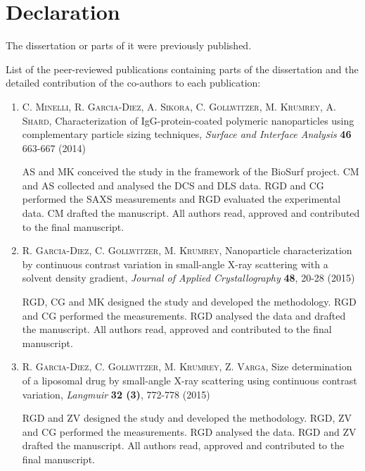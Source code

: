 \noindent
\pagestyle{empty}

\section*{Declaration}

The dissertation or parts of it were previously published.
\vspace{2ex}

List of the peer-reviewed publications containing parts of the dissertation and the detailed contribution of the co-authors to each publication:

\begin{enumerate}

    \item \textsc{C. Minelli, R. Garcia-Diez, A. Sikora, C. Gollwitzer, M. Krumrey, A. Shard}, Characterization of IgG-protein-coated polymeric nanoparticles using complementary particle sizing techniques, \emph{Surface and Interface Analysis} \textbf{46} 663-667 (2014)

        \hspace{10pt} AS and MK conceived the study in the framework of the BioSurf project. CM and AS collected and analysed the DCS and DLS data. RGD and CG performed the SAXS measurements and RGD evaluated the experimental data. CM drafted the manuscript. All authors read, approved and contributed to the final manuscript.

    \item \textsc{R. Garcia-Diez, C. Gollwitzer, M. Krumrey}, Nanoparticle characterization by continuous contrast variation in small-angle {{X}}-ray scattering with a solvent density gradient, \emph{Journal of Applied Crystallography} \textbf{48}, 20-28 (2015)

        \hspace{10pt} RGD, CG and MK designed the study and developed the methodology. RGD and CG performed the measurements. RGD analysed the data and drafted the manuscript. All authors read, approved and contributed to the final manuscript.

    \item \textsc{R. Garcia-Diez, C. Gollwitzer, M. Krumrey, Z. Varga}, Size determination of a liposomal drug by small-angle X-ray scattering using continuous contrast variation, \emph{Langmuir} \textbf{32 (3)}, 772-778 (2015)

        \hspace{10pt} RGD and ZV designed the study and developed the methodology. RGD, ZV and CG performed the measurements. RGD analysed the data. RGD and ZV drafted the manuscript. All authors read, approved and contributed to the final manuscript.
        

\end{enumerate}
